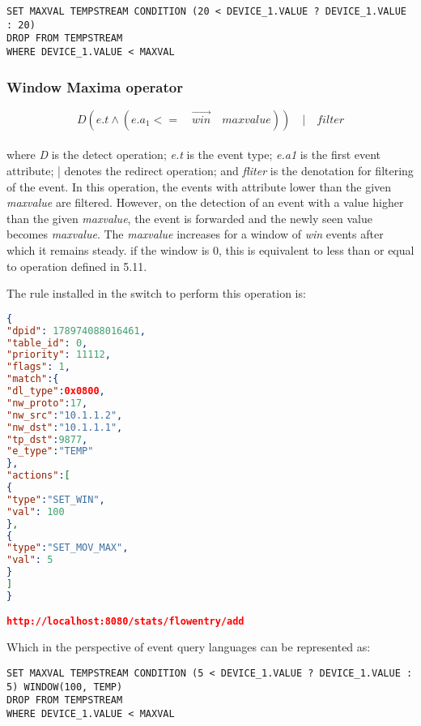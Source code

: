 \begin{verbatim}
SET MAXVAL TEMPSTREAM CONDITION (20 < DEVICE_1.VALUE ? DEVICE_1.VALUE : 20)
DROP FROM TEMPSTREAM
WHERE DEVICE_1.VALUE < MAXVAL
\end{verbatim}

\subsubsection{Window Maxima operator}
\begin{equation}
D(e.t  \wedge (e.a_1  <=\quad \overrightarrow{win} \quad maxvalue)) \quad | \quad filter
\end{equation}\\
where \textit{D} is the detect operation; \newline
\textit{e.t} is the event type; \newline
\textit{e.a1} is the first event attribute; \newline
| denotes the redirect operation; \newline
and \textit{fliter} is the denotation for filtering of the event. \newline \newline
In this operation, the events with attribute lower than the given \textit{maxvalue} are filtered. However, on the detection of an event with a value higher than the given \textit{maxvalue}, the event is forwarded and the newly seen value becomes \textit{maxvalue}. The \textit{maxvalue} increases for a window of \textit{win} events after which it remains steady. if the window is 0, this is equivalent to less than or equal to operation defined in 5.11.

The rule installed in the switch to perform this operation is:
\begin{lstlisting}[language=json,firstnumber=1]
{
"dpid": 178974088016461,
"table_id": 0,
"priority": 11112,
"flags": 1,
"match":{
"dl_type":0x0800,
"nw_proto":17,
"nw_src":"10.1.1.2",
"nw_dst":"10.1.1.1",
"tp_dst":9877,
"e_type":"TEMP"
},
"actions":[
{
"type":"SET_WIN",
"val": 100
},
{
"type":"SET_MOV_MAX",
"val": 5
}
]
}

http://localhost:8080/stats/flowentry/add \end{lstlisting}

Which in the perspective of event query languages can be represented as:

\begin{verbatim}
SET MAXVAL TEMPSTREAM CONDITION (5 < DEVICE_1.VALUE ? DEVICE_1.VALUE : 5) WINDOW(100, TEMP) 
DROP FROM TEMPSTREAM
WHERE DEVICE_1.VALUE < MAXVAL
\end{verbatim}

